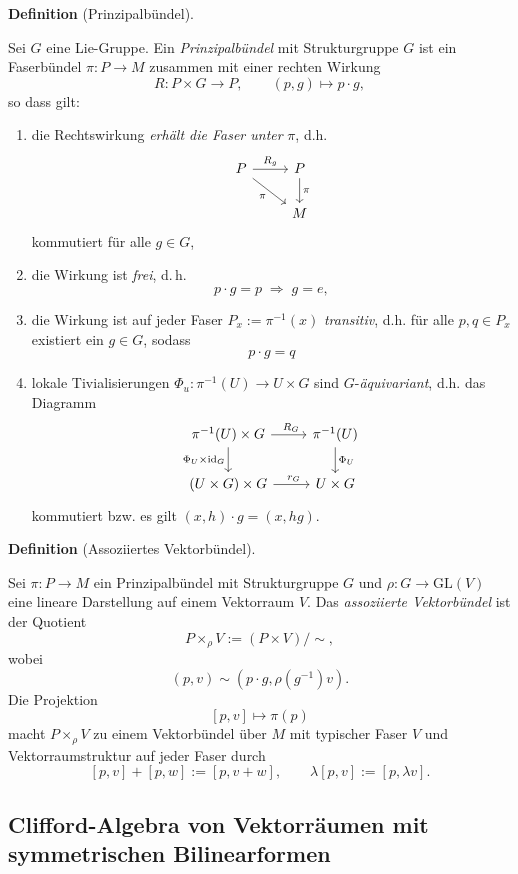 \documentclass[10pt, letterpaper]{article}
\newcommand{\id}{\operatorname{id}}
\newcommand{\GL}{\mathrm{GL}}
\newcommand{\CustomHeading}[3]{%
  \par\medskip\noindent%
  \textbf{#1 #2} \textnormal{(#3)}.\enskip%
}
\newenvironment{DEF}[2]{\CustomHeading{Definition}{#1}{#2}}{}
\begin{document}
\begin{DEF}{}{Prinzipalbündel}
Sei $G$ eine Lie-Gruppe. Ein \emph{Prinzipalbündel}
mit Strukturgruppe $G$ ist ein Faserbündel $\pi:P\to M$ zusammen mit einer rechten Wirkung
\[
R: P\times G\to P,\qquad (p,g)\mapsto p\cdot g,
\]
so dass gilt:
\begin{enumerate}
    \item die Rechtswirkung \emph{erhält die Faser unter} $\pi$, d.h. 
    \[
    \begin{tikzcd}
    P \arrow[r,"R_g"] \arrow[dr,"\pi"'] & P \arrow[d,"\pi"] \\
    & M
    \end{tikzcd}
    \]
    kommutiert für alle $g\in G$,
    \item die Wirkung ist \emph{frei}, d.\,h.
    \[
    p\cdot g=p \;\Rightarrow\; g=e,
    \]
    \item die Wirkung ist auf jeder Faser $P_x:=\pi^{-1}(x)$ \emph{transitiv}, d.h. für alle $p,q\in P_x$ existiert ein $g\in G$, sodass 
    $$p\cdot g=q$$
    \item lokale Tivialisierungen $\Phi_u:\pi^{-1}(U)\to U\times G$ sind $G$-\emph{äquivariant}, d.h. das Diagramm
    \[
    \begin{tikzcd}
    \pi^{-1}(U)\times G \arrow[r,"\ \ R_G\ "] \arrow[d,"\Phi_U\times \id_G"'] & \pi^{-1}(U) \arrow[d,"\Phi_U"] \\
    (U\times G)\times G \arrow[r,"\ \ r_G\ "] & U\times G
    \end{tikzcd}
    \]
    kommutiert bzw. es gilt $(x,h)\cdot g=(x,hg)$.
\end{enumerate}
\end{DEF}


\begin{DEF}{}{Assoziiertes Vektorbündel}
Sei \(\pi:P\to M\) ein Prinzipalbündel mit Strukturgruppe \(G\) und $\rho:G\to \GL(V)$ eine lineare Darstellung auf einem Vektorraum \(V\). Das \emph{assoziierte Vektorbündel}
ist der Quotient
\[
P\times_\rho V:=(P\times V)/\sim,
\]
wobei
\[
(p,v)\sim (p\cdot g,\rho(g^{-1})v).
\]
Die Projektion
\[
[p,v]\mapsto \pi(p)
\]
macht \(P\times_\rho V\) zu einem Vektorbündel über \(M\) mit typischer Faser \(V\) und Vektorraumstruktur auf jeder Faser durch
\[
[p,v]+[p,w]:=[p,v+w],
\qquad
\lambda [p,v]:=[p,\lambda v].
\]
\end{DEF}



\subsection{Clifford-Algebra von Vektorräumen mit symmetrischen Bilinearformen}
\end{document}
